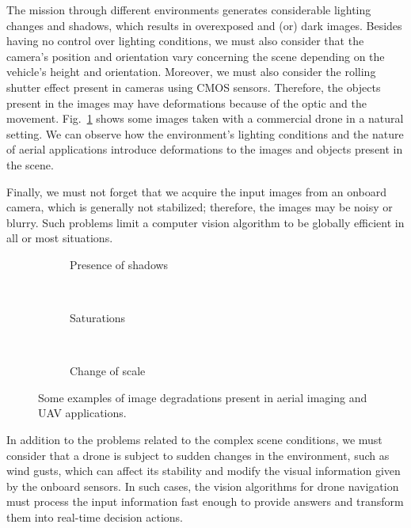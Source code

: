The mission through different environments generates considerable lighting changes and shadows, which results in overexposed and (or) dark images. Besides having no control over lighting conditions, we must also consider that the camera's position and orientation vary concerning the scene depending on the vehicle's height and orientation. Moreover, we must also consider the rolling shutter effect present in cameras using CMOS sensors. Therefore, the objects present in the images may have deformations because of the optic and the movement. Fig.\ \ref{fig:img_drone_degradations} shows some images taken with a commercial drone in a natural setting. We can observe how the environment's lighting conditions and the nature of aerial applications introduce deformations to the images and objects present in the scene. 

Finally, we must not forget that we acquire the input images from an onboard camera, which is generally not stabilized; therefore, the images may be noisy or blurry. Such problems limit a computer vision algorithm to be globally efficient in all or most situations.


\begin{figure}[!ht]
    \centering
    \begin{subfigure}[b]{0.38\textwidth}
        \caption{Presence of shadows}
    \end{subfigure}
        ~ %
    \begin{subfigure}[b]{0.38\textwidth}
        \caption{Saturations}
    \end{subfigure}
        ~ %
    \begin{subfigure}[b]{0.38\textwidth}
        \caption{Change of scale}
    \end{subfigure} 
    \caption{Some examples of image degradations present in aerial imaging and UAV applications.}\label{fig:img_drone_degradations}
\end{figure}

In addition to the problems related to the complex scene conditions, we must consider that a drone is subject to sudden changes in the environment, such as wind gusts, which can affect its stability and modify the visual information given by the onboard sensors. In such cases, the vision algorithms for drone navigation must process the input information fast enough to provide answers and transform them into real-time decision actions.


